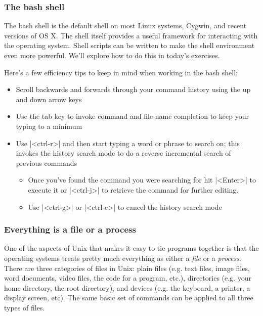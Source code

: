 \subsubsection{The bash shell}

The bash shell is the default shell on most Linux systems, Cygwin, and recent versions of OS X.  The shell itself provides a useful framework for interacting with the operating system. Shell scripts can be written to make the shell environment even more powerful. We'll explore how to do this in today's exercises. 

Here's a few efficiency tips to keep in mind when working in the bash shell:
\begin{itemize}
    \item Scroll backwards and forwards through your command history using the up and down arrow keys
    \item Use the tab key to invoke command and file-name completion to keep your typing to a minimum
    \item Use |<ctrl-r>| and then start typing a word or phrase to search on; this invokes the history search mode to do a reverse incremental search of previous commands
    \begin{itemize}
        \item Once you've found the command you were searching for hit |<Enter>| to execute it or |<ctrl-j>| to retrieve the command for further editing.
        \item Use |<ctrl-g>| or |<ctrl-c>| to cancel the history search mode
    \end{itemize}
\end{itemize}



\subsubsection{Everything is a file or a process}

One of the aspects of Unix that makes it easy to tie programs together is that the operating systems treats pretty much everything as either a \emph{file} or a \emph{process}.  There are three categories of files in Unix: plain files (e.g. text files, image files, word documents, video files, the code for a program, etc.), directories (e.g. your home directory, the root directory), and devices (e.g. the keyboard, a printer, a display screen, etc). The same basic set of commands can be applied to all three types of files.

